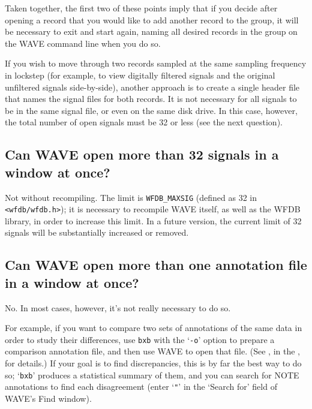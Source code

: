 \documentclass[twoside]{book}
\newcommand{\WAVE}{{\sf WAVE}\xspace}
\begin{document}
Taken together, the first two of these points imply that if you decide after
opening a record that you would like to add another record to the group, it
will be necessary to exit and start again, naming all desired records in the
group on the \WAVE{} command line when you do so.

If you wish to move through two records sampled at the same sampling
frequency in lockstep (for example, to view digitally filtered signals
and the original unfiltered signals side-by-side), another approach is
to create a single header file that names the signal files for both
records.  It is not necessary for all signals to be in the same signal
file, or even on the same disk drive.  In this case, however, the total
number of open signals must be 32 or less (see the next question).

\subsection{Can \WAVE{} open more than 32 signals in a window at once?}

Not without recompiling.  The limit is {\tt WFDB\_MAXSIG} (defined as 32 in
{\tt <wfdb/wfdb.h>});  it is necessary to recompile \WAVE{} itself, as well as
the WFDB library, in order to increase this limit.  In a future version,
the current limit of 32 signals will be substantially increased or removed.

\subsection{Can \WAVE{} open more than one annotation file in a window at once?}

No.  In most cases, however, it's not really necessary to do so.

For example, if you want to compare two sets of annotations of the
same data in order to study their differences, use {\tt bxb} with the
`{\tt -o}' option to prepare a comparison annotation file, and then
use \WAVE{} to open that file.  (See 
, in the
,
for details.)  If your goal is to
find discrepancies, this is by far the best way to do so; `{\tt bxb}'
produces a statistical summary of them, and you can search for {\sf
NOTE} annotations to find each disagreement (enter `{\tt "}' in the
`{\sf Search for}' field of \WAVE{}'s {\sf Find} window).
\end{document}
